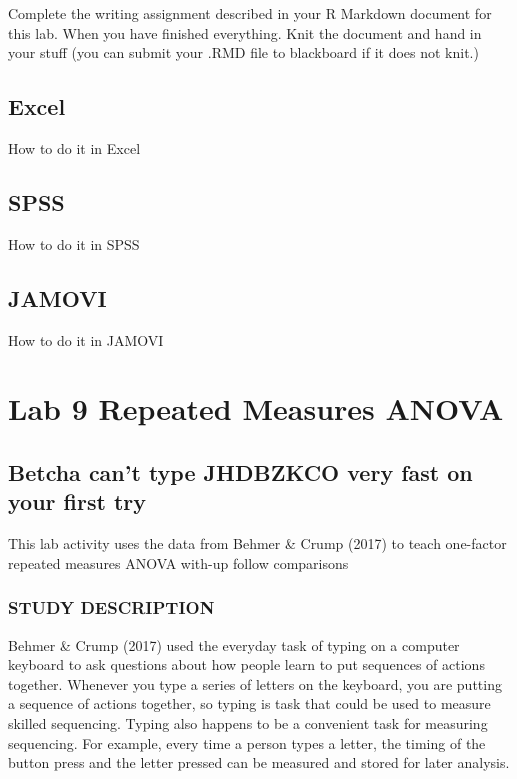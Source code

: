 \documentclass[]{book}
\theoremstyle{definition}
\theoremstyle{definition}
\theoremstyle{definition}
\theoremstyle{remark}
\begin{document}
Complete the writing assignment described in your R Markdown document
for this lab. When you have finished everything. Knit the document and
hand in your stuff (you can submit your .RMD file to blackboard if it
does not knit.)

\section{Excel}\label{excel-7}

How to do it in Excel

\section{SPSS}\label{spss-7}

How to do it in SPSS

\section{JAMOVI}\label{jamovi-7}

How to do it in JAMOVI

\chapter{Lab 9 Repeated Measures
ANOVA}\label{lab-9-repeated-measures-anova}

\section{Betcha can't type JHDBZKCO very fast on your first
try}\label{betcha-cant-type-jhdbzkco-very-fast-on-your-first-try}

This lab activity uses the data from Behmer \& Crump (2017) to teach
one-factor repeated measures ANOVA with-up follow comparisons

\subsection{STUDY DESCRIPTION}\label{study-description-3}

Behmer \& Crump (2017) used the everyday task of typing on a computer
keyboard to ask questions about how people learn to put sequences of
actions together. Whenever you type a series of letters on the keyboard,
you are putting a sequence of actions together, so typing is task that
could be used to measure skilled sequencing. Typing also happens to be a
convenient task for measuring sequencing. For example, every time a
person types a letter, the timing of the button press and the letter
pressed can be measured and stored for later analysis.
\end{document}
